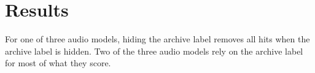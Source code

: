 \section{Results}
For one of three audio models, hiding the archive label removes all hits when the archive label is hidden. Two of the three audio models rely on the archive label for most of what they score.
